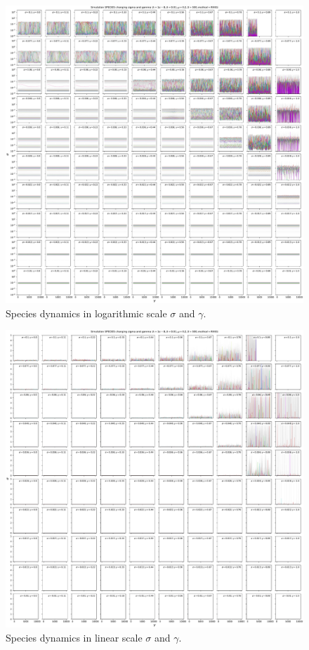 \documentclass{article}
\begin{document}
\begin{figure}[H]
    \centering
    \includegraphics[width=\linewidth]{SigmaGamma/10Species.pdf}
    \caption{Species dynamics in logarithmic scale $\sigma$ and $\gamma$.}
\end{figure}

\clearpage

\begin{figure}[H]
    \centering
    \includegraphics[width=\linewidth]{SigmaGamma/10SpeciesLinear.pdf}
    \caption{Species dynamics in linear scale $\sigma$ and $\gamma$.}
\end{figure}
\end{document}
